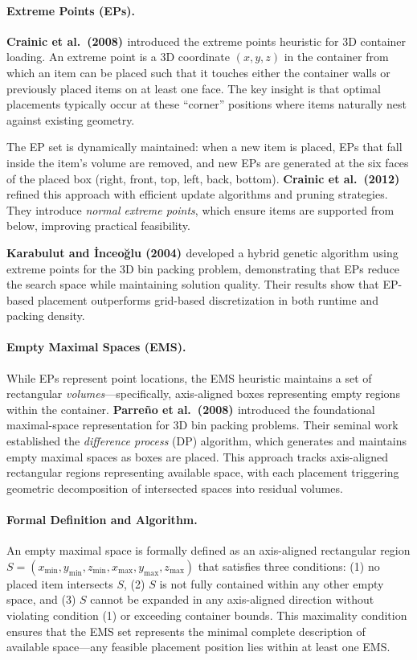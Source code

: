 \paragraph{Extreme Points (EPs).}
\textbf{Crainic et al.\ (2008) \cite{CPP08}} introduced the extreme points heuristic for 3D container loading. An extreme point is a 3D coordinate $(x, y, z)$ in the container from which an item can be placed such that it touches either the container walls or previously placed items on at least one face. The key insight is that optimal placements typically occur at these ``corner'' positions where items naturally nest against existing geometry.

The EP set is dynamically maintained: when a new item is placed, EPs that fall inside the item's volume are removed, and new EPs are generated at the six faces of the placed box (right, front, top, left, back, bottom). \textbf{Crainic et al.\ (2012) \cite{CPP12}} refined this approach with efficient update algorithms and pruning strategies. They introduce \textit{normal extreme points}, which ensure items are supported from below, improving practical feasibility.

\textbf{Karabulut and İnceoğlu (2004) \cite{KI04}} developed a hybrid genetic algorithm using extreme points for the 3D bin packing problem, demonstrating that EPs reduce the search space while maintaining solution quality. Their results show that EP-based placement outperforms grid-based discretization in both runtime and packing density.

\paragraph{Empty Maximal Spaces (EMS).}
While EPs represent point locations, the EMS heuristic maintains a set of rectangular \textit{volumes}---specifically, axis-aligned boxes representing empty regions within the container. \textbf{Parreño et al.\ (2008) \cite{PARO08}} introduced the foundational maximal-space representation for 3D bin packing problems. Their seminal work established the \textit{difference process} (DP) algorithm, which generates and maintains empty maximal spaces as boxes are placed. This approach tracks axis-aligned rectangular regions representing available space, with each placement triggering geometric decomposition of intersected spaces into residual volumes.

\paragraph{Formal Definition and Algorithm.}
An empty maximal space is formally defined as an axis-aligned rectangular region $S = (x_{\min}, y_{\min}, z_{\min}, x_{\max}, y_{\max}, z_{\max})$ that satisfies three conditions: (1) no placed item intersects $S$, (2) $S$ is not fully contained within any other empty space, and (3) $S$ cannot be expanded in any axis-aligned direction without violating condition (1) or exceeding container bounds. This maximality condition ensures that the EMS set represents the minimal complete description of available space---any feasible placement position lies within at least one EMS.

